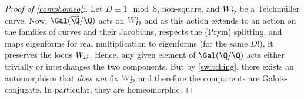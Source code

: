 \documentclass{amsart}
\begin{document}
\begin{proof}[Proof of \autoref{comphomeo}:]
Let $D\equiv 1\mod 8$, non-square, and $\W^i$ be a Teichmüller curve. Now, $\Gal(\overline{\Q}/\Q)$ acts on $\W^i$ and as this action extends to an action on the families of curves and their Jacobians, respects the (Prym) splitting, and maps eigenforms for real multiplication to eigenforms (for the same $D$!), it preserves the locus $\W$. Hence, any given element of $\Gal(\overline{\Q}/\Q)$ acts either trivially or interchanges the two components. But by \autoref{switching}, there exists an automorphism that \textit{does not} fix $\W^i$ and therefore the components are Galois-conjugate. In particular, they are homeomorphic.
\end{proof}

\printbibliography
\end{document}
